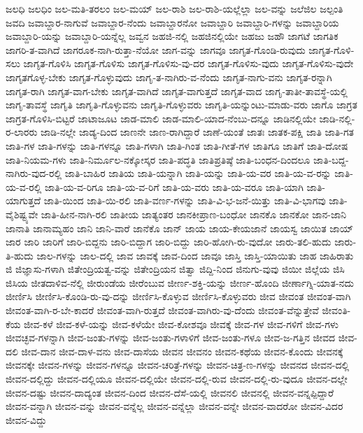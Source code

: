 {ಜಲಧಿ
ಜಲಧಿಂ
ಜಲ-ಮತಿ-ತರಲಂ
ಜಲ-ಮಯ್
ಜಲ-ರಾಶಿ
ಜಲ-ರಾಶಿ-ಯಲ್ಲೆಲ್ಲಾ
ಜಲ-ವನ್ನು
ಜಲೆಜಿಲ
ಜಲ್ಪಂತಿ
ಜವದಿ
ಜವಾಬ್ದಾರ-ನಾಗುವೆ
ಜವಾಬ್ದಾರ-ನೆಂದು
ಜವಾಬ್ದಾರನೋ
ಜವಾಬ್ದಾರಿ
ಜವಾಬ್ದಾರಿ-ಗಳನ್ನು
ಜವಾಬ್ದಾರಿಯ
ಜವಾಬ್ದಾರಿ-ಯನ್ನು
ಜವಾಬ್ದಾರಿ-ಯನ್ನೆಲ್ಲ
ಜವ್ವನ
ಜಹಜಿ-ನಲ್ಲಿ
ಜಹಜಿನಲ್ಲಿಯೇ
ಜಹಜು
ಜಹೌ
ಜಾಗಟೆ
ಜಾಗತಿಕ
ಜಾಗರಿ-ತ-ವಾಗಿದೆ
ಜಾಗರೂಕ-ನಾಗಿ-ರುತ್ತಾ-ನೆಯೋ
ಜಾಗ-ವನ್ನು
ಜಾಗವೂ
ಜಾಗೃತ-ಗೊಂಡಿ-ರುವುದು
ಜಾಗೃತ-ಗೊಳಿ-ಸಲು
ಜಾಗೃತ-ಗೊಳಿಸಿ
ಜಾಗೃತ-ಗೊಳಿಸು
ಜಾಗೃತ-ಗೊಳಿಸು-ವು-ದರ
ಜಾಗೃತ-ಗೊಳಿಸು-ವುದು
ಜಾಗೃತ-ಗೊಳಿಸು-ವುದೇ
ಜಾಗೃತಗೊಳ್ಳ-ಬೇಕು
ಜಾಗೃತ-ಗೊಳ್ಳುವುದು
ಜಾಗೃ-ತ-ನಾಗಿರು-ವ-ನೆಂದು
ಜಾಗೃತ-ನಾಗು-ವನು
ಜಾಗೃತ-ರನ್ನಾಗಿ
ಜಾಗೃತ-ರಾಗಿ
ಜಾಗೃತ-ವಾಗ-ಬೇಕು
ಜಾಗೃತ-ವಾಗಿದೆ
ಜಾಗೃತ-ವಾಗುತ್ತದೆ
ಜಾಗೃತ-ವಾದ
ಜಾಗೃ-ತಾತೀ-ತಾವಸ್ಥೆ-ಯಲ್ಲಿ
ಜಾಗೃ-ತಾವಸ್ಥೆ
ಜಾಗೃತಿ
ಜಾಗೃತಿ-ಗೊಳ್ಳುವನು
ಜಾಗೃತಿ-ಗೊಳ್ಳುವರು
ಜಾಗೃತಿ-ಯನ್ನುಂಟು-ಮಾಡು-ವರು
ಜಾಗೊ
ಜಾಗ್ರತ
ಜಾಗ್ರತ-ಗೊಳಿಸಿ-ಬಿಟ್ಟರೆ
ಜಾಟಾಜೂಟ
ಜಾಡ-ಮಾಲಿ
ಜಾಡ-ಮಾಲಿ-ಯಾದ-ನೆಂಬು-ದನ್ನೂ
ಜಾಡಿನಲ್ಲಿಯೇ
ಜಾಡಿ-ನಲ್ಲಿ-ರ-ಲಾರರು
ಜಾಡಿ-ನಲ್ಲೇ
ಜಾಡ್ಯ-ದಿಂದ
ಜಾಣನೇ
ಜಾಣ-ರಾಗಿದ್ದಾರೆ
ಜಾಣೆ-ಯಂತೆ
ಜಾತಃ
ಜಾತಕ-ಪಕ್ಷಿ
ಜಾತಿ
ಜಾತಿ-ಗತ
ಜಾತಿ-ಗಳ
ಜಾತಿ-ಗಳನ್ನು
ಜಾತಿ-ಗಳನ್ನೂ
ಜಾತಿ-ಗಳಾಗಿ
ಜಾತಿ-ಗಿಂತ
ಜಾತಿ-ಗೀತೆ-ಗಳ
ಜಾತಿಗೂ
ಜಾತಿಗೆ
ಜಾತಿ-ದೋಷ
ಜಾತಿ-ನಿಯಮ-ಗಳು
ಜಾತಿ-ನಿರ್ಮೂಲ-ನಕ್ಕೋಸ್ಕರ
ಜಾತಿ-ಪದ್ಧತಿ
ಜಾತಿಪ್ರತಿಷ್ಠೆ
ಜಾತಿ-ಬಂಧನ-ದಿಂದಲೂ
ಜಾತಿ-ಬದ್ದ-ನಾಗಿರು-ವುದ-ರಲ್ಲಿ
ಜಾತಿ-ಬಾಹಿರ
ಜಾತಿಯ
ಜಾತಿ-ಯನ್ನಾಗಿ
ಜಾತಿ-ಯನ್ನು
ಜಾತಿ-ಯ-ವರ
ಜಾತಿ-ಯ-ವ-ರನ್ನು
ಜಾತಿ-ಯ-ವ-ರಲ್ಲಿ
ಜಾತಿ-ಯ-ವ-ರಿಗೂ
ಜಾತಿ-ಯ-ವ-ರಿಗೆ
ಜಾತಿ-ಯ-ವರು
ಜಾತಿ-ಯ-ವರೂ
ಜಾತಿ-ಯಾಗಿ
ಜಾತಿ-ಯಾಗುತ್ತದೆ
ಜಾತಿ-ಯಿಂದ
ಜಾತಿ-ಯಿ-ರಲಿ
ಜಾತಿ-ವರ್ಣ-ಗಳನ್ನು
ಜಾತಿ-ವಿ-ಭ-ಜನೆ-ಯಿತ್ತು
ಜಾತಿ-ವಿ-ಭಾಗವು
ಜಾತಿ-ವೈಶಿಷ್ಟ್ಯವೇ
ಜಾತಿ-ಹೀನ-ನಾಗಿ-ರಲಿ
ಜಾತೀಯ
ಜಾತ್ಯಂತರ
ಜಾನಕೀಪ್ರಾಣ-ಬಂಧೋ
ಜಾನಕೊ
ಜಾನಕೋ
ಜಾನ-ಜಾನಿ
ಜಾನಾತಿ
ಜಾನಾಮ್ಯಹಂ
ಜಾನಿ
ಜಾನಿ-ವಾರೆ
ಜಾನೆಕೊ
ಜಾನ್
ಜಾಯ
ಜಾಯ-ಕೇಯಜಾನೆ
ಜಾಯಸ್ವ
ಜಾಯಿತ
ಜಾಯ್
ಜಾರ
ಜಾರಿ
ಜಾರಿಗೆ
ಜಾರಿ-ಬಿದ್ದನು
ಜಾರಿ-ಬಿದ್ದಾಗ
ಜಾರಿ-ಬಿದ್ದು
ಜಾರಿ-ಹೋಗಿ-ರು-ವುದೋ
ಜಾರು-ತಲಿ-ಹುದು
ಜಾರು-ತಿ-ಹುದು
ಜಾಲ-ಗಳನ್ನು
ಜಾಲ-ದಲ್ಲಿ
ಜಾವ
ಜಾವಕ್ಕೆ
ಜಾವ-ದಿಂದ
ಜಾವೂ
ಜಾಸ್ತಿ
ಜಾಸ್ತಿ-ಯಾಯಿತು
ಜಾಹ
ಜಾಹಿರಾತು
ಜಿ
ಜಿಜ್ಞಾಸು-ಗಳಾಗಿ
ಜಿತೇಂದ್ರಿಯತ್ವ-ವನ್ನು
ಜಿತೇಂದ್ರಿಯನ
ಜಿತ್ವಾ
ಜಿದ್ದಿ-ನಿಂದ
ಜಿನುಗು-ವುವು
ಜಿಯೀ
ಜಿಲ್ಲೆಯ
ಜಿಸಿ
ಜಿಸಿಯ
ಜೀತದಾಳಿವ-ನೆಲ್ಲಿ
ಜೀರುಂಡೆಯ
ಜೀರೆಂಬುವ
ಜೀರ್ಣ-ಶಕ್ತಿ-ಯನ್ನು
ಜೀರ್ಣ-ಹೊಂದಿ
ಜೀರ್ಣಾಗ್ನಿ-ಯಾತ-ನದು
ಜೀರ್ಣಿಸಿ
ಜೀರ್ಣಿಸಿ-ಕೊಂಡಿ-ರು-ವು-ದನ್ನು
ಜೀರ್ಣಿಸಿ-ಕೊಳ್ಳುವ
ಜೀರ್ಣಿಸಿ-ಕೊಳ್ಳುವರು
ಜೀವ
ಜೀವಂತ
ಜೀವಂತ-ವಾಗಿ
ಜೀವಂತ-ವಾಗಿ-ರ-ಬೇ-ಕಾದರೆ
ಜೀವಂತ-ವಾಗಿ-ರುತ್ತದೆ
ಜೀವಂತ-ವಾಗಿರು-ವು-ದೆಂದು
ಜೀವಂತ-ವೆನ್ನುತ್ತೇವೆ
ಜೀವಂತಿ-ಕೆಯ
ಜೀವ-ಕಳೆ
ಜೀವ-ಕಳೆ-ಯನ್ನು
ಜೀವ-ಕಳೆಯೇ
ಜೀವ-ಕೋಶವೂ
ಜೀವಕ್ಕೆ
ಜೀವ-ಗಳ
ಜೀವ-ಗಳಿಗೆ
ಜೀವ-ಗಳು
ಜೀವಚ್ಛವ-ಗಳನ್ನಾಗಿ
ಜೀವ-ಜಂತು-ಗಳನ್ನು
ಜೀವ-ಜಂತು-ಗಳಾಳಿಗೆ
ಜೀವ-ಜಂತು-ಗಳೂ
ಜೀವ-ಜ-ಗತ್ತಿನ
ಜೀವದ
ಜೀವ-ದಲಿ
ಜೀವ-ದಾನ
ಜೀವ-ದಾಳ-ವನು
ಜೀವ-ದಾಸೆಯ
ಜೀವನ
ಜೀವನಂ
ಜೀವನ-ಕಥೆಯ
ಜೀವನ-ಕೊಂದು
ಜೀವನಕ್ಕೆ
ಜೀವನಕ್ಕೇ
ಜೀವನ-ಗಳನ್ನು
ಜೀವನ-ಗಳನ್ನೂ
ಜೀವನ-ಚರಿತ್ರೆ-ಗಳನ್ನು
ಜೀವನ-ಚಿತ್ರ-ಣ-ಗಳನ್ನು
ಜೀವನದ
ಜೀವನ-ದಲ್ಲಿ
ಜೀವನ-ದಲ್ಲಿದ್ದು
ಜೀವನ-ದಲ್ಲಿಯೂ
ಜೀವನ-ದಲ್ಲಿಯೇ
ಜೀವನ-ದಲ್ಲಿ-ರುವ
ಜೀವನ-ದಲ್ಲಿ-ರು-ವುದೂ
ಜೀವನ-ದಲ್ಲೇ
ಜೀವನ-ದಷ್ಟು
ಜೀವನ-ದಾದ್ಯಂತ
ಜೀವನ-ದಿಂದ
ಜೀವನ-ದೆಸೆ-ಯಲ್ಲಿ
ಜೀವನಲಿ
ಜೀವನಲ್ಲಿ
ಜೀವನ-ವನ್ನಪ್ಪಿದ್ದಾರೆ
ಜೀವನ-ವನ್ನಾಗಿ
ಜೀವನ-ವನ್ನು
ಜೀವನ-ವನ್ನೆಲ್ಲ
ಜೀವನ-ವನ್ನೆಲ್ಲಾ
ಜೀವನ-ವನ್ನೇ
ಜೀವನ-ವಾದರೋ
ಜೀವನ-ವಿದರ
ಜೀವನ-ವಿದ್ದು
}
